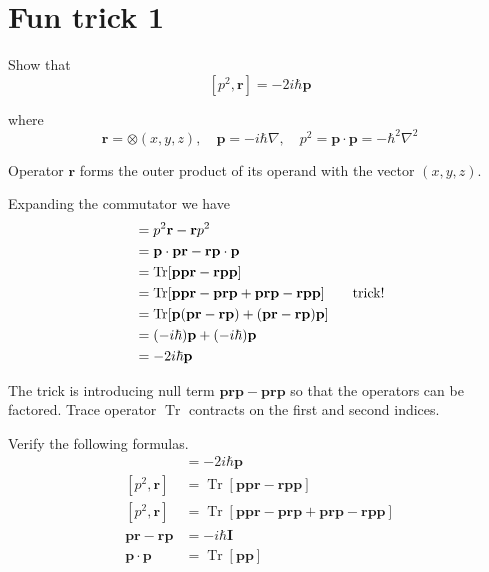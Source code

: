 

\section*{Fun trick 1}

Show that
\begin{equation*}
\left[p^2,\mathbf r\right]=-2i\hbar\mathbf p
\end{equation*}

where
\begin{equation*}
\mathbf r=\otimes(x,y,z),\quad
\mathbf p=-i\hbar\nabla,\quad
p^2=\mathbf p\cdot\mathbf p=-\hbar^2\nabla^2
\end{equation*}

Operator $\mathbf r$ forms the outer product of its operand
with the vector $(x,y,z)$.

\bigskip
Expanding the commutator we have
\begin{align*}
[p^2,\mathbf r]
&=p^2\mathbf r-\mathbf rp^2
\\
&=\mathbf p\cdot\mathbf p\mathbf r-\mathbf r \mathbf p\cdot\mathbf p
\\
&=\operatorname{Tr}[\mathbf{ppr}-\mathbf{rpp}]
\\
&=\operatorname{Tr}[\mathbf p\mathbf p\mathbf r-\mathbf p\mathbf r\mathbf p
+\mathbf p\mathbf r\mathbf p-\mathbf r\mathbf p\mathbf p]
\tag*{\text{trick!}}
\\
&=\operatorname{Tr}[\mathbf p(\mathbf{pr}-\mathbf{rp})
+(\mathbf{pr}-\mathbf{rp})\mathbf p]
\\
&=(-i\hbar)\mathbf p+(-i\hbar)\mathbf p
\\
&=-2i\hbar\mathbf p
\end{align*}

The trick is introducing null term $\mathbf{prp}-\mathbf{prp}$
so that the operators can be factored.
Trace operator $\operatorname{Tr}$ contracts on the first and second indices.

\bigskip
Verify the following formulas.
\begin{align*}
[p^2,\mathbf r]
&=-2i\hbar\mathbf p
\tag{1}
\\[1ex]
[p^2,\mathbf r]
&=\operatorname{Tr}[\mathbf{ppr}-\mathbf{rpp}]
\tag{2}
\\[1ex]
[p^2,\mathbf r]
&=\operatorname{Tr}[\mathbf p\mathbf p\mathbf r-\mathbf p\mathbf r\mathbf p
+\mathbf p\mathbf r\mathbf p-\mathbf r\mathbf p\mathbf p]
\tag{3}
\\[1ex]
\mathbf p\mathbf r-\mathbf r\mathbf p&=-i\hbar\mathbf I
\tag{4}
\\[1ex]
\mathbf p\cdot\mathbf p&=\operatorname{Tr}[\mathbf p\mathbf p]
\tag{5}
\end{align*}

